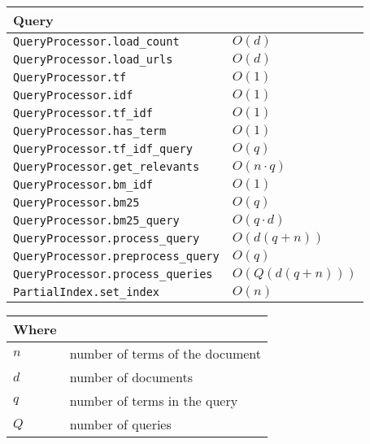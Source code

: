 \documentclass[sigconf,authorversion,nonacm]{acmart}
\def\code#1{\texttt{#1}}
\begin{document}
\begin{tabular}{ll}
  Query                                   &                  \\
  \toprule
  \code{QueryProcessor.load\_count}       & $O(d)$           \\
  \code{QueryProcessor.load\_urls}        & $O(d)$           \\
  \code{QueryProcessor.tf}                & $O(1)$           \\
  \code{QueryProcessor.idf}               & $O(1)$           \\
  \code{QueryProcessor.tf\_idf}           & $O(1)$           \\
  \code{QueryProcessor.has\_term}         & $O(1)$           \\
  \code{QueryProcessor.tf\_idf\_query}    & $O(q)$           \\
  \code{QueryProcessor.get\_relevants}    & $O(n\cdot q)$    \\
  \code{QueryProcessor.bm\_idf}           & $O(1)$           \\
  \code{QueryProcessor.bm25}              & $O(q)$           \\
  \code{QueryProcessor.bm25\_query}       & $O(q \cdot d)$   \\
  \code{QueryProcessor.process\_query}    & $O(d(q + n))$    \\
  \code{QueryProcessor.preprocess\_query} & $O(q)$           \\
  \code{QueryProcessor.process\_queries}  & $O(Q(d(q + n)))$ \\
  \code{PartialIndex.set\_index}          & $O(n)$           \\



  \bottomrule
\end{tabular}

\begin{tabular}{ll}
  Where                                 \\
  \toprule

  $n$ & number of terms of the document \\
  $d$ & number of documents             \\
  $q$ & number of terms in the query    \\
  $Q$ & number of queries               \\
  \bottomrule
\end{tabular}

\bigskip
\end{document}
